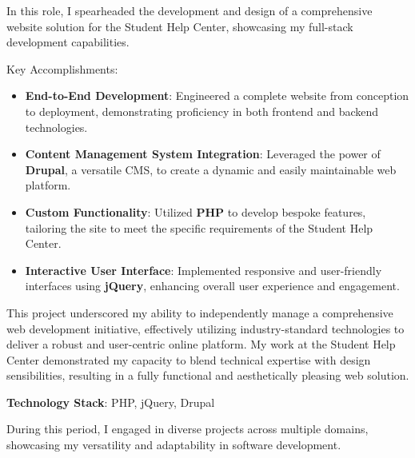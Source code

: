\vspace{2cm}
\newpage
{}
\bigskip

In this role, I spearheaded the development and design of a comprehensive website solution for the Student Help Center, showcasing my full-stack development capabilities.

Key Accomplishments:
\begin{itemize}
    \item \textbf{End-to-End Development}: Engineered a complete website from conception to deployment, demonstrating proficiency in both frontend and backend technologies.
    
    \item \textbf{Content Management System Integration}: Leveraged the power of \textbf{Drupal}, a versatile CMS, to create a dynamic and easily maintainable web platform.
    
    \item \textbf{Custom Functionality}: Utilized \textbf{PHP} to develop bespoke features, tailoring the site to meet the specific requirements of the Student Help Center.
    
    \item \textbf{Interactive User Interface}: Implemented responsive and user-friendly interfaces using \textbf{jQuery}, enhancing overall user experience and engagement.
\end{itemize}

This project underscored my ability to independently manage a comprehensive web development initiative, effectively utilizing industry-standard technologies to deliver a robust and user-centric online platform. My work at the Student Help Center demonstrated my capacity to blend technical expertise with design sensibilities, resulting in a fully functional and aesthetically pleasing web solution.

\smallskip
\textbf{Technology Stack}:
PHP, jQuery, Drupal

\bigskip
\divider
\bigskip

During this period, I engaged in diverse projects across multiple domains, showcasing my versatility and adaptability in software development.

